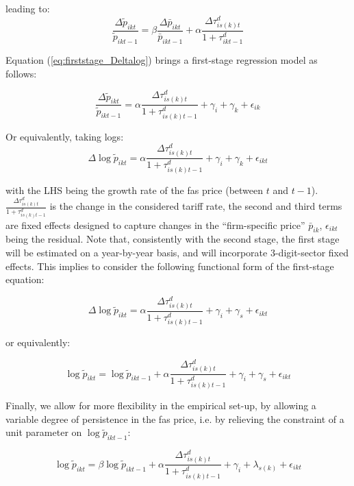 \documentclass[a4paper,11pt]{article}
\begin{document}
leading to:
\begin{equation}
\frac{\Delta \widetilde{p}_{ikt}}{\widetilde{p}_{ikt-1}} =  \beta \frac{\Delta \bar{p}_{ikt}}{\bar{p}_{ikt-1}} +\alpha\frac{\Delta \tau^d_{is(k)t}}{1+\tau_{ikt-1}^d} \label{eq:firststage_Deltalog}
\end{equation}

Equation (\ref{eq:firststage_Deltalog}) brings a first-stage regression model as follows:

$$\frac{\Delta \widetilde{p}_{ikt}}{\widetilde{p}_{ikt-1}} = \alpha \frac{\Delta \tau^d_{is(k)t}}{1+\tau_{is(k)t-1}^d} + \gamma_{i} +\gamma_{k}+\epsilon_{ik}$$

Or equivalently, taking logs:
$$\Delta \log \widetilde{p}_{ikt}= \alpha\frac{\Delta \tau^d_{is(k)t}}{1+\tau_{is(k)t-1}^d} +\gamma_{i} +\gamma_{k}+\epsilon_{ikt}$$


\noindent with the LHS being the growth rate of the fas price (between $t$ and $t-1$). $\frac{\Delta \tau^d_{is(k)t}}{1+\tau_{is(k)t-1}^d}$ is the change in the considered tariff rate, the second and third terms are fixed effects designed to capture changes in the ``firm-specific price'' $\bar{p}_{ik}$, $\epsilon_{ikt}$ being the residual. Note that, consistently with the second stage, the first stage will be estimated on a year-by-year basis, and will incorporate 3-digit-sector fixed effects. This implies to consider the following functional form of the first-stage equation:

\begin{equation}
\Delta \log \widetilde{p}_{ikt} = \alpha\frac{\Delta \tau^d_{is(k)t}}{1+\tau_{is(k)t-1}^d} +\gamma_{i} +\gamma_{s}+\epsilon_{ikt} \label{eq:firststage_Deltalog}
\end{equation}

or equivalently:

\begin{equation}
\log \widetilde{p}_{ikt} = \log \widetilde{p}_{ikt-1} + \alpha\frac{\Delta \tau^d_{is(k)t}}{1+\tau_{is(k)t-1}^d} +\gamma_{i} +\gamma_{s}+\epsilon_{ikt} \label{eq:firststage_Deltalog_bis}
\end{equation}

Finally, we allow for more flexibility in the empirical set-up, by allowing a variable degree of persistence in the fas price, i.e. by relieving the constraint of a unit parameter on $\log \widetilde{p}_{ikt-1}$:


\begin{equation}
\log \widetilde{p}_{ikt} = \beta\log \widetilde{p}_{ikt-1} + \alpha\frac{\Delta \tau^d_{is(k)t}}{1+\tau_{is(k)t-1}^d} +\gamma_{i} +\lambda_{s(k)}+\epsilon_{ikt} \label{eq:firststage_final}
\end{equation}
\end{document}
